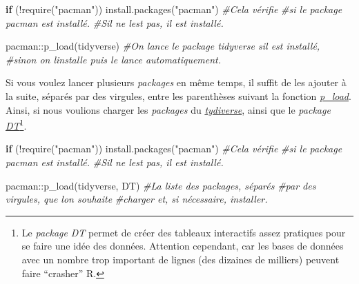 \documentclass[
]{book}
\newenvironment{Shaded}{\begin{snugshade}}{\end{snugshade}}
\newcommand{\CommentTok}[1]{\textcolor[rgb]{0.56,0.35,0.01}{\textit{#1}}}
\newcommand{\ControlFlowTok}[1]{\textcolor[rgb]{0.13,0.29,0.53}{\textbf{#1}}}
\newcommand{\FunctionTok}[1]{\textcolor[rgb]{0.00,0.00,0.00}{#1}}
\newcommand{\NormalTok}[1]{#1}
\newcommand{\SpecialCharTok}[1]{\textcolor[rgb]{0.00,0.00,0.00}{#1}}
\newcommand{\StringTok}[1]{\textcolor[rgb]{0.31,0.60,0.02}{#1}}
\begin{document}
\begin{Shaded}
\begin{Highlighting}[]
\ControlFlowTok{if}\NormalTok{ (}\SpecialCharTok{!}\FunctionTok{require}\NormalTok{(}\StringTok{"pacman"}\NormalTok{)) }\FunctionTok{install.packages}\NormalTok{(}\StringTok{"pacman"}\NormalTok{) }\CommentTok{\#Cela vérifie}
                             \CommentTok{\#si le package pacman est installé.}
                             \CommentTok{\#S\textquotesingle{}il ne l\textquotesingle{}est pas, il est installé.}

\NormalTok{pacman}\SpecialCharTok{::}\FunctionTok{p\_load}\NormalTok{(tidyverse) }\CommentTok{\#On lance le package tidyverse s\textquotesingle{}il est installé,}
                          \CommentTok{\#sinon on l\textquotesingle{}installe puis le lance automatiquement.}
\end{Highlighting}
\end{Shaded}

Si vous voulez lancer plusieurs \emph{packages} en même temps, il suffit de les ajouter à la suite, séparés par des virgules, entre les parenthèses suivant la fonction \href{https://www.rdocumentation.org/packages/pacman/versions/0.5.1/topics/p_load}{\emph{p\_load}}. Ainsi, si nous voulions charger les \emph{packages} du \href{https://www.tidyverse.org/}{\emph{tydiverse}}, ainsi que le \emph{package} \href{https://rstudio.github.io/DT/}{\emph{DT}}\footnote{Le \emph{package} \emph{DT} permet de créer des tableaux interactifs assez pratiques pour se faire une idée des données. Attention cependant, car les bases de données avec un nombre trop important de lignes (des dizaines de milliers) peuvent faire ``crasher'' R.}.

\begin{Shaded}
\begin{Highlighting}[]
\ControlFlowTok{if}\NormalTok{ (}\SpecialCharTok{!}\FunctionTok{require}\NormalTok{(}\StringTok{"pacman"}\NormalTok{)) }\FunctionTok{install.packages}\NormalTok{(}\StringTok{"pacman"}\NormalTok{) }\CommentTok{\#Cela vérifie}
                             \CommentTok{\#si le package pacman est installé.}
                             \CommentTok{\#S\textquotesingle{}il ne l\textquotesingle{}est pas, il est installé.}

\NormalTok{pacman}\SpecialCharTok{::}\FunctionTok{p\_load}\NormalTok{(tidyverse, DT) }\CommentTok{\#La liste des packages, séparés}
                      \CommentTok{\#par des virgules, que l\textquotesingle{}on souhaite}
                      \CommentTok{\#charger et, si nécessaire, installer.}
\end{Highlighting}
\end{Shaded}
\end{document}
